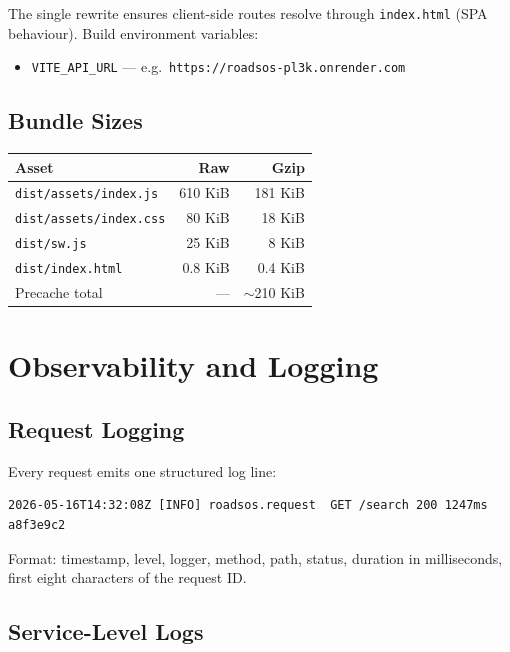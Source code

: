 \documentclass[11pt, a4paper]{article}
\newcommand{\code}[1]{\texttt{\small#1}}
\begin{document}
The single rewrite ensures client-side routes resolve through \code{index.html} (SPA behaviour). Build environment variables:

\begin{itemize}[leftmargin=*, itemsep=2pt, topsep=2pt]
  \item \code{VITE\_API\_URL} --- e.g.\ \code{https://roadsos-pl3k.onrender.com}
\end{itemize}

\subsection{Bundle Sizes}

\begin{tabularx}{\textwidth}{l r r}
\toprule
\textbf{Asset} & \textbf{Raw} & \textbf{Gzip} \\
\midrule
\code{dist/assets/index.js} & 610 KiB & 181 KiB \\
\code{dist/assets/index.css} & 80 KiB & 18 KiB \\
\code{dist/sw.js} & 25 KiB & 8 KiB \\
\code{dist/index.html} & 0.8 KiB & 0.4 KiB \\
Precache total & --- & $\sim$210 KiB \\
\bottomrule
\end{tabularx}

\section{Observability and Logging}

\subsection{Request Logging}

Every request emits one structured log line:

\begin{lstlisting}[numbers=none,frame=none]
2026-05-16T14:32:08Z [INFO] roadsos.request  GET /search 200 1247ms a8f3e9c2
\end{lstlisting}

Format: timestamp, level, logger, method, path, status, duration in milliseconds, first eight characters of the request ID.

\subsection{Service-Level Logs}
\end{document}
